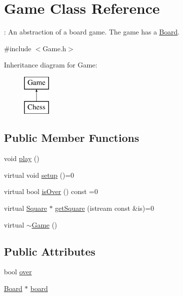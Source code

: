 \hypertarget{classGame}{}\section{Game Class Reference}
\label{classGame}


\+: An abstraction of a board game. The game has a \hyperlink{classBoard}{Board}.  




{\ttfamily \#include $<$Game.\+h$>$}

Inheritance diagram for Game\+:\begin{figure}[H]
\begin{center}
\leavevmode
\includegraphics[height=2.000000cm]{classGame}
\end{center}
\end{figure}
\subsection*{Public Member Functions}
\begin{DoxyCompactItemize}
\item 
void \hyperlink{classGame_aa333825d0bca80e91e53c7e23f053405}{play} ()
\item 
virtual void \hyperlink{classGame_a49067dcf360cfe353b9a99910136ac26}{setup} ()=0
\item 
virtual bool \hyperlink{classGame_aa07345e2f71668d147c0ed2257ed0e50}{is\+Over} () const  =0
\item 
virtual \hyperlink{classSquare}{Square} $\ast$ \hyperlink{classGame_a78d07b6a2cedd5150b856cfa41a087da}{get\+Square} (istream const \&is)=0
\item 
virtual \hyperlink{classGame_ae3d112ca6e0e55150d2fdbc704474530}{$\sim$\+Game} ()
\end{DoxyCompactItemize}
\subsection*{Public Attributes}
\begin{DoxyCompactItemize}
\item 
bool \hyperlink{classGame_ae82939826eff0a8847cb822cf95227f4}{over}
\item 
\hyperlink{classBoard}{Board} $\ast$ \hyperlink{classGame_ae38e501e177586af48d2e2300b6be4ba}{board}
\end{DoxyCompactItemize}


